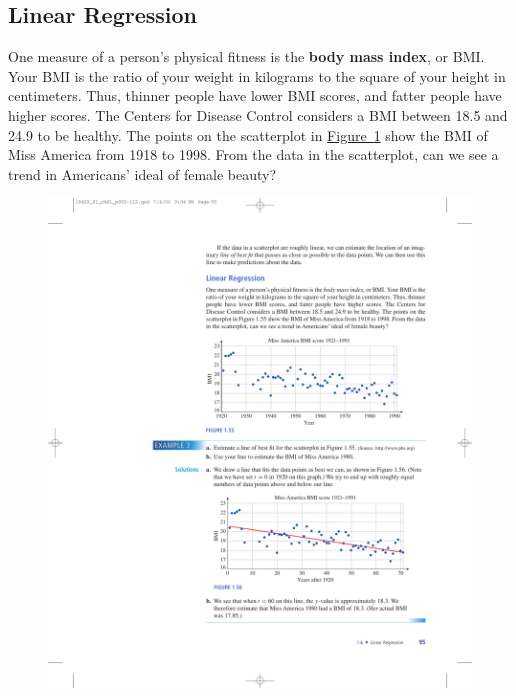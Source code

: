 \documentclass[10pt,]{book}
\newcommand{\terminology}[1]{\textbf{#1}}
\theoremstyle{plain}
\theoremstyle{definition}
\theoremstyle{definition}
\theoremstyle{definition}
\theoremstyle{definition}
\numberwithin{equation}{part}
\begin{document}
\subsection[{Linear Regression}]{Linear Regression}\label{subsection-35}
One measure of a person's physical fitness is the \terminology{body mass index}, or BMI. Your BMI is the ratio of your weight in kilograms to the square of your height in centimeters. Thus, thinner people have lower BMI scores, and fatter people have higher scores. The Centers for Disease Control considers a BMI between 18.5 and 24.9 to be healthy. The points on the scatterplot in \hyperref[fig-BMI]{Figure~\ref{fig-BMI}} show the BMI of Miss America from 1918 to 1998. From the data in the scatterplot, can we see a trend in Americans’ ideal of female beauty?%
\begin{figure}
\centering
\includegraphics[width=1\linewidth]{images/fig-BMI}
\caption{\label{fig-BMI}}
\end{figure}
\end{document}

